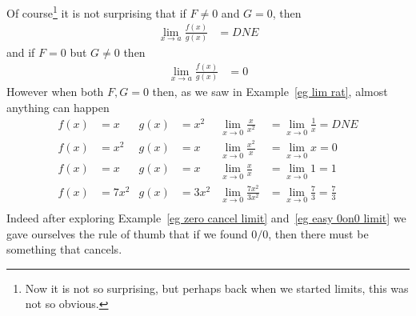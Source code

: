 Of course\footnote{Now it is not so surprising, but perhaps back when we started limits,
this was not so obvious.} it is not surprising that if $F\ne 0$ and $G= 0$, then
\begin{align*}
\lim_{x\to a}\frac{f(x)}{g(x)} &= DNE
\end{align*}
and if $F=0$ but $G\neq 0$ then
\begin{align*}
\lim_{x\to a}\frac{f(x)}{g(x)} &= 0
\end{align*}
However when both $F,G=0$ then, as we saw in Example~\ref{eg lim rat}, almost anything
can happen
\begin{align*}
  f(x)&=x & g(x)&=x^2 & \lim_{x\to0} \frac{x}{x^2}
  &= \lim_{x\to0} \frac{1}{x} = DNE \\
  f(x)&=x^2 & g(x)&=x & \lim_{x\to0} \frac{x^2}{x}
  &= \lim_{x\to0} x  = 0 \\
  f(x)&=x & g(x)&=x & \lim_{x\to0} \frac{x}{x}
  &= \lim_{x\to0} 1 = 1  \\
  f(x)&=7x^2 & g(x)&=3x^2 & \lim_{x\to0} \frac{7x^2}{3x^2}
  &= \lim_{x\to0} \frac{7}{3} = \frac{7}{3} \\
\end{align*}
Indeed after exploring Example~\ref{eg zero cancel limit} and~\ref{eg easy 0on0 limit} we
gave ourselves the rule of thumb that if we found $0/0$, then there must be something
that cancels.

